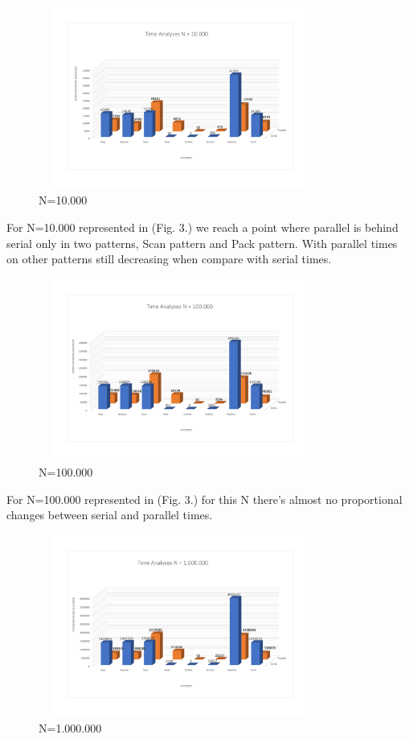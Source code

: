\documentclass[10pt,journal,compsoc]{IEEEtran}
\begin{document}
\begin{figure}[H]
\hspace*{-0.24in}
\includegraphics[height=6cm,width=9.44cm]{jpeg/n=10000.pdf}
\caption{N=10.000}
\label{figura:n10000}
\end{figure}

For N=10.000 represented in (Fig. 3.) we reach a point where parallel is behind serial only in two patterns, Scan pattern and Pack pattern. With parallel times on other patterns still decreasing when compare with serial times.

\begin{figure}[H]
\hspace*{-0.24in}
\includegraphics[height=6cm,width=9.44cm]{jpeg/n=100000.pdf}
\caption{N=100.000}
\label{figura:n100000}
\end{figure}

For N=100.000 represented in (Fig. 3.) for this N there's almost no proportional changes between serial and parallel times.

\begin{figure}[H]
\hspace*{-0.24in}
\includegraphics[height=6cm,width=9.44cm]{jpeg/n=1000000.pdf}
\caption{N=1.000.000}
\label{figura:n1000000}
\end{figure}
\end{document}
